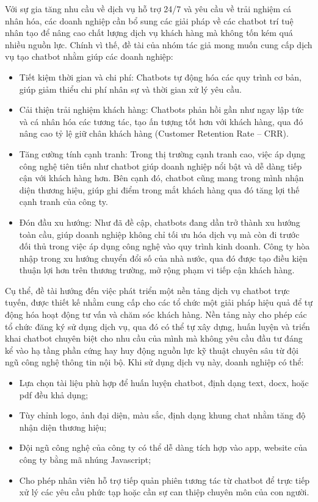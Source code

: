 Với sự gia tăng nhu cầu về dịch vụ hỗ trợ 24/7 và yêu cầu về trải nghiệm cá nhân hóa, các doanh nghiệp cần bổ sung các giải pháp về các chatbot trí tuệ nhân tạo để nâng cao chất lượng dịch vụ khách hàng mà không tốn kém quá nhiều nguồn lực. Chính vì thế, đề tài của nhóm tác giả mong muốn cung cấp dịch vụ tạo chatbot nhằm giúp các doanh nghiệp:

\begin{itemize}
    \item Tiết kiệm thời gian và chi phí: Chatbots tự động hóa các quy trình cơ bản, giúp giảm thiểu chi phí nhân sự và thời gian xử lý yêu cầu.
    \item Cải thiện trải nghiệm khách hàng: Chatbots phản hồi gần như ngay lập tức và cá nhân hóa các tương tác, tạo ấn tượng tốt hơn với khách hàng, qua đó nâng cao tỷ lệ giữ chân khách hàng (Customer Retention Rate – CRR).  
    \item Tăng cường tính cạnh tranh: Trong thị trường cạnh tranh cao, việc áp dụng công nghệ tiên tiến như chatbot giúp doanh nghiệp nổi bật và dễ dàng tiếp cận với khách hàng hơn. Bên cạnh đó, chatbot cũng mang trong mình nhận diện thương hiệu, giúp ghi điểm trong mắt khách hàng qua đó tăng lợi thế cạnh tranh của công ty.
    \item Đón đầu xu hướng: Như đã đề cập, chatbots đang dần trở thành xu hướng toàn cầu, giúp doanh nghiệp không chỉ tối ưu hóa dịch vụ mà còn đi trước đối thủ trong việc áp dụng công nghệ vào quy trình kinh doanh. Công ty hòa nhập trong xu hướng chuyển đổi số của nhà nước, qua đó được tạo điều kiện thuận lợi hơn trên thương trường, mở rộng phạm vi tiếp cận khách hàng.
\end{itemize}

Cụ thể, đề tài hướng đến việc phát triển một nền tảng dịch vụ chatbot trực tuyến, được thiết kế nhằm cung cấp cho các tổ chức một giải pháp hiệu quả để tự động hóa hoạt động tư vấn và chăm sóc khách hàng. Nền tảng này cho phép các tổ chức đăng ký sử dụng dịch vụ, qua đó có thể tự xây dựng, huấn luyện và triển khai chatbot chuyên biệt cho nhu cầu của mình mà không yêu cầu đầu tư đáng kể vào hạ tầng phần cứng hay huy động nguồn lực kỹ thuật chuyên sâu từ đội ngũ công nghệ thông tin nội bộ. Khi sử dụng dịch vụ này, doanh nghiệp có thể:

\begin{itemize}
    \item Lựa chọn tài liệu phù hợp để huấn luyện chatbot, định dạng text, docx, hoặc pdf đều khả dụng;
    \item Tùy chỉnh logo, ảnh đại diện, màu sắc, định dạng khung chat nhằm tăng độ nhận diện thương hiệu;
    \item Đội ngũ công nghệ của công ty có thể dễ dàng tích hợp vào app, website của công ty bằng mã nhúng Javascript;
    \item Cho phép nhân viên hỗ trợ tiếp quản phiên tương tác từ chatbot để trực tiếp xử lý các yêu cầu phức tạp hoặc cần sự can thiệp chuyên môn của con người.
\end{itemize}

